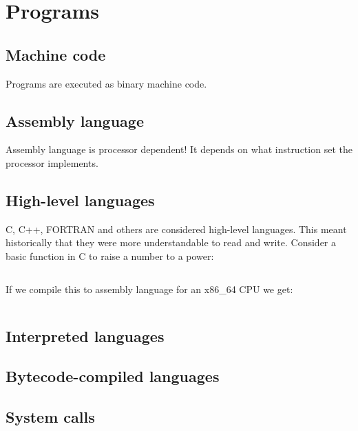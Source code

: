 \chapter{Programs}
\label{ch:processes}

\section{Machine code}

Programs are executed as binary machine code.

\section{Assembly language}

Assembly language is processor dependent!
It depends on what instruction set the processor implements.

\section{High-level languages}

C, C++, FORTRAN and others are considered high-level languages.
This meant historically that they were more understandable to read and write.
Consider a basic function in C to raise a number to a power: 

\inputminted{c}{program.c}

If we compile this to assembly language for an x86\_64 CPU we get: 

\inputminted{asm}{program.asm}

\section{Interpreted languages}

\section{Bytecode-compiled languages}

\section{System calls}



